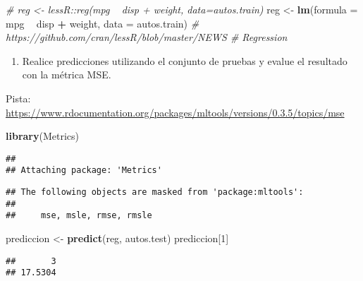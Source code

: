 \documentclass[]{article}
\newenvironment{Shaded}{\begin{snugshade}}{\end{snugshade}}
\newcommand{\CommentTok}[1]{\textcolor[rgb]{0.56,0.35,0.01}{\textit{#1}}}
\newcommand{\DataTypeTok}[1]{\textcolor[rgb]{0.13,0.29,0.53}{#1}}
\newcommand{\DecValTok}[1]{\textcolor[rgb]{0.00,0.00,0.81}{#1}}
\newcommand{\KeywordTok}[1]{\textcolor[rgb]{0.13,0.29,0.53}{\textbf{#1}}}
\newcommand{\NormalTok}[1]{#1}
\newcommand{\OperatorTok}[1]{\textcolor[rgb]{0.81,0.36,0.00}{\textbf{#1}}}
\newcommand{\StringTok}[1]{\textcolor[rgb]{0.31,0.60,0.02}{#1}}
\providecommand{\tightlist}{%
  \setlength{\itemsep}{0pt}\setlength{\parskip}{0pt}}
\begin{document}
\begin{Shaded}
\begin{Highlighting}[]
\CommentTok{# reg <- lessR::reg(mpg ~ disp + weight, data=autos.train)}
\NormalTok{reg <-}\StringTok{ }\KeywordTok{lm}\NormalTok{(}\DataTypeTok{formula =}\NormalTok{ mpg }\OperatorTok{~}\StringTok{ }\NormalTok{disp }\OperatorTok{+}\StringTok{ }\NormalTok{weight, }\DataTypeTok{data =}\NormalTok{ autos.train) }\CommentTok{# https://github.com/cran/lessR/blob/master/NEWS # Regression}
\end{Highlighting}
\end{Shaded}

\begin{enumerate}
\def\labelenumi{\arabic{enumi}.}
\setcounter{enumi}{4}
\tightlist
\item
  Realice predicciones utilizando el conjunto de pruebas y evalue el
  resultado con la métrica MSE.
\end{enumerate}

Pista:
\url{https://www.rdocumentation.org/packages/mltools/versions/0.3.5/topics/mse}

\begin{Shaded}
\begin{Highlighting}[]
\KeywordTok{library}\NormalTok{(Metrics)}
\end{Highlighting}
\end{Shaded}

\begin{verbatim}
## 
## Attaching package: 'Metrics'
\end{verbatim}

\begin{verbatim}
## The following objects are masked from 'package:mltools':
## 
##     mse, msle, rmse, rmsle
\end{verbatim}

\begin{Shaded}
\begin{Highlighting}[]
\NormalTok{prediccion <-}\StringTok{ }\KeywordTok{predict}\NormalTok{(reg, autos.test)}
\NormalTok{prediccion[}\DecValTok{1}\NormalTok{]}
\end{Highlighting}
\end{Shaded}

\begin{verbatim}
##       3 
## 17.5304
\end{verbatim}

\begin{Shaded}
\end{Shaded}
\end{document}
